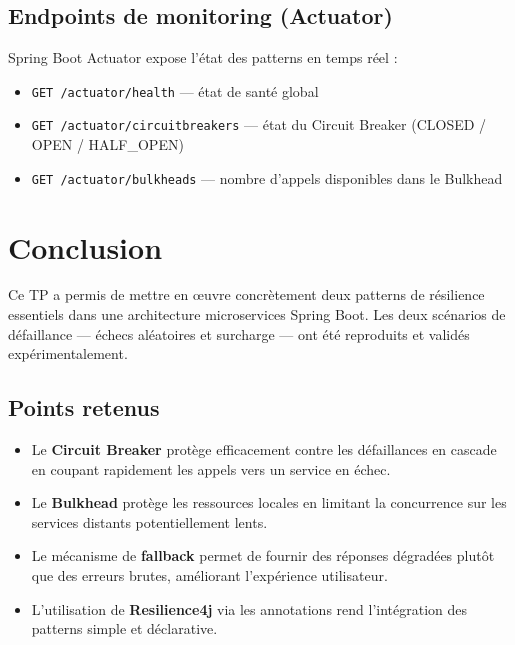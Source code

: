 \documentclass[11pt,a4paper]{article}
\begin{document}
\subsection*{Endpoints de monitoring (Actuator)}

Spring Boot Actuator expose l'état des patterns en temps réel :

\begin{itemize}[leftmargin=*, label=\textcolor{primaryblue}{$\blacktriangleright$}]
    \item \texttt{GET /actuator/health} --- état de santé global
    \item \texttt{GET /actuator/circuitbreakers} --- état du Circuit Breaker (CLOSED / OPEN / HALF\_OPEN)
    \item \texttt{GET /actuator/bulkheads} --- nombre d'appels disponibles dans le Bulkhead
\end{itemize}

\section{Conclusion}

Ce TP a permis de mettre en œuvre concrètement deux patterns de résilience essentiels dans une architecture microservices Spring Boot. Les deux scénarios de défaillance --- échecs aléatoires et surcharge --- ont été reproduits et validés expérimentalement.

\subsection*{Points retenus}
\begin{itemize}[leftmargin=*, label=\textcolor{primaryblue}{$\blacktriangleright$}]
    \item Le \textbf{Circuit Breaker} protège efficacement contre les défaillances en cascade en coupant rapidement les appels vers un service en échec.
    \item Le \textbf{Bulkhead} protège les ressources locales en limitant la concurrence sur les services distants potentiellement lents.
    \item Le mécanisme de \textbf{fallback} permet de fournir des réponses dégradées plutôt que des erreurs brutes, améliorant l'expérience utilisateur.
    \item L'utilisation de \textbf{Resilience4j} via les annotations rend l'intégration des patterns simple et déclarative.
\end{itemize}
\end{document}
